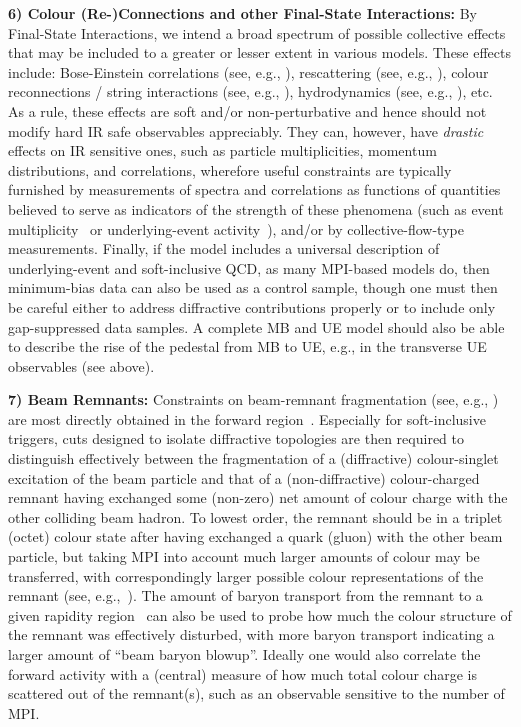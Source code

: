%
%
\textbf{6) Colour (Re-)Connections and other Final-State Interactions:}  
 By Final-State Interactions,
  we intend a broad spectrum of possible collective effects that may
  be included to a greater or lesser extent in various models. These
  effects include: Bose-Einstein correlations (see,
  e.g., \cite{Lonnblad:1997kk}), 
rescattering (see, e.g., \cite{Corke:2009tk}), 
colour reconnections / string
  interactions  (see,
  e.g., \cite{Rathsman:1998tp,Skands:2007zg,Bopp:2011fw,Gieseke:2012ft,Christiansen:2015yqa}),  
  hydrodynamics (see, e.g., \cite{Werner:2011zzc}), 
etc. 
  As a rule, these effects
  are soft and/or non-perturbative and hence should not modify hard IR safe
  observables appreciably. They can, 
  however, have \emph{drastic} effects on IR sensitive ones, such as
  particle multiplicities, momentum distributions, and correlations, 
  wherefore useful constraints are typically furnished by 
  measurements of spectra and correlations as functions of
  quantities believed to 
  serve as indicators of the strength of these phenomena 
  (such as event multiplicity~\cite{Petrov:2012hca,Bierlich:2015rha,Adam:2016emw} or underlying-event
  activity~\cite{Martin:2016igp}), and/or by collective-flow-type 
  measurements. 
  Finally, if the model includes a universal description of
  underlying-event and soft-inclusive QCD, as many MPI-based models do, then
  minimum-bias data can also be used as a control sample, though one must
  then be careful either to address diffractive contributions properly
  or to include only gap-suppressed data samples. A complete MB and UE
  model should also be able to describe the rise of the pedestal from
  MB to UE, e.g., in the transverse UE observables (see above).

\textbf{7) Beam Remnants:} Constraints on beam-remnant fragmentation
(see, e.g., \cite{Sjostrand:2004pf}) are most directly obtained in the forward
  region~\cite{Chatrchyan:2011wm,Chatrchyan:2011wb,Aspell:2012ux,Chatrchyan:2013gfi,Aaij:2014pza,Chatrchyan:2014qka,Antchev:2014lez}. Especially
  for soft-inclusive triggers, cuts designed to isolate diffractive
  topologies are then required to distinguish effectively between the
  fragmentation of a (diffractive) colour-singlet excitation of the
  beam particle and that of a (non-diffractive) colour-charged
  remnant having exchanged some (non-zero) net amount of
  colour charge with the other colliding beam hadron. To lowest
  order, the remnant should be in a triplet (octet) colour state after
  having exchanged a quark (gluon) with the other beam particle, but
  taking MPI into account much larger amounts of colour may be
  transferred, with correspondingly larger possible colour
  representations of the remnant (see, e.g.,~\cite{Christiansen:2015yqa}). 
The amount of baryon transport from the remnant
  to a given rapidity region~\cite{Erhan:1979ba,Aaij:2011va,Abazov:2015sri} can
  also be used to probe how much the colour 
  structure of the remnant was effectively disturbed, with more baryon
  transport indicating a larger amount of ``beam baryon blowup''.
Ideally one would also correlate the forward activity with a (central) measure of
how much total colour charge is scattered out of the remnant(s), such as
an observable sensitive to the number of MPI. 

